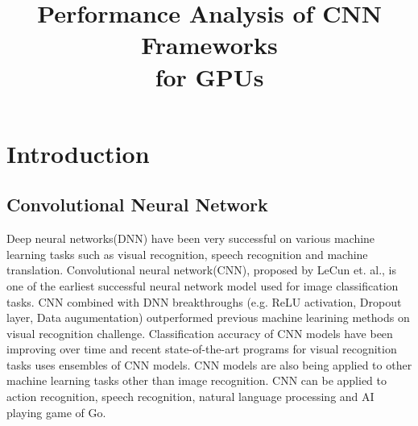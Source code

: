 \documentclass[conference]{IEEEtran}
\begin{document}
\title{Performance Analysis of CNN Frameworks\\for GPUs}

\author{
\and
{}
}

\maketitle

\begin{abstract}
\end{abstract}

\IEEEpeerreviewmaketitle

\section{Introduction}

\subsection{Convolutional Neural Network}
Deep neural networks(DNN) have been very successful on various machine learning tasks such as visual recognition, speech recognition and machine translation.
\cite{}%
Convolutional neural network(CNN), proposed by LeCun et. al., is one of the earliest successful neural network model used for image classification tasks.
\cite{}%
CNN combined with DNN breakthroughs (e.g. ReLU activation, Dropout layer, Data augumentation) outperformed previous machine learining methods on visual recognition challenge.
\cite{}%
Classification accuracy of CNN models have been improving over time and recent state-of-the-art programs for visual recognition tasks uses ensembles of CNN models.
\cite{}%
CNN models are also being applied to other machine learning tasks other than image recognition. CNN can be applied to action recognition, speech recognition, natural language processing and AI playing game of Go.
\cite{}%
\end{document}
